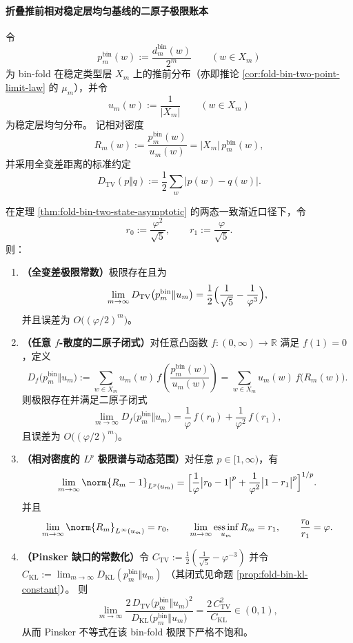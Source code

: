 \paragraph{折叠推前相对稳定层均匀基线的二原子极限账本}
令
\[
p^{\mathrm{bin}}_m(w):=\frac{d^{\mathrm{bin}}_m(w)}{2^m}\qquad(w\in X_m)
\]
为 bin-fold 在稳定类型层 \(X_m\) 上的推前分布（亦即推论 \ref{cor:fold-bin-two-point-limit-law} 的 \(\mu_m\)），并令
\[
u_m(w):=\frac{1}{|X_m|}
\qquad(w\in X_m)
\]
为稳定层均匀分布。
记相对密度
\[
R_m(w):=\frac{p^{\mathrm{bin}}_m(w)}{u_m(w)}=|X_m|\,p^{\mathrm{bin}}_m(w),
\]
并采用全变差距离的标准约定
\[
D_{\mathrm{TV}}(p\Vert q):=\frac12\sum_{w}\bigl|p(w)-q(w)\bigr|.
\]

\begin{theorem}\label{thm:xi-foldbin-pushforward-uniform-two-atom-ledger}
在定理 \ref{thm:fold-bin-two-state-asymptotic} 的两态一致渐近口径下，令
\[
r_0:=\frac{\varphi^2}{\sqrt5},\qquad r_1:=\frac{\varphi}{\sqrt5}.
\]
则：
\begin{enumerate}
  \item \textbf{（全变差极限常数）}极限存在且为
  \[
  \lim_{m\to\infty}D_{\mathrm{TV}}\bigl(p^{\mathrm{bin}}_m\Vert u_m\bigr)
  =\frac12\Bigl(\frac{1}{\sqrt5}-\frac{1}{\varphi^3}\Bigr),
  \]
  并且误差为 \(O\bigl((\varphi/2)^m\bigr)\)。
  \item \textbf{（任意 \(f\)-散度的二原子闭式）}对任意凸函数 \(f:(0,\infty)\to\mathbb R\) 满足 \(f(1)=0\)，定义
  \[
  D_f\bigl(p^{\mathrm{bin}}_m\Vert u_m\bigr)
  :=\sum_{w\in X_m}u_m(w)\,f\!\left(\frac{p^{\mathrm{bin}}_m(w)}{u_m(w)}\right)
  =\sum_{w\in X_m}u_m(w)\,f\!\bigl(R_m(w)\bigr).
  \]
  则极限存在并满足二原子闭式
  \[
  \lim_{m\to\infty}D_f\bigl(p^{\mathrm{bin}}_m\Vert u_m\bigr)
  =\frac{1}{\varphi}\,f(r_0)+\frac{1}{\varphi^2}\,f(r_1),
  \]
  且误差为 \(O\bigl((\varphi/2)^m\bigr)\)。
  \item \textbf{（相对密度的 \(L^p\) 极限谱与动态范围）}对任意 \(p\in[1,\infty)\)，有
  \[
  \lim_{m\to\infty}\norm{R_m-1}_{L^p(u_m)}
  =
  \Bigl[\frac{1}{\varphi}\bigl|r_0-1\bigr|^p+\frac{1}{\varphi^2}\bigl|1-r_1\bigr|^p\Bigr]^{1/p}.
  \]
  并且
  \[
  \lim_{m\to\infty}\norm{R_m}_{L^\infty(u_m)}=r_0,\qquad
  \lim_{m\to\infty}\operatorname*{ess\,inf}_{u_m}R_m=r_1,
  \qquad
  \frac{r_0}{r_1}=\varphi.
  \]
  \item \textbf{（Pinsker 缺口的常数化）}令
  \(
  C_{\mathrm{TV}}:=\frac12(\frac{1}{\sqrt5}-\varphi^{-3})
  \)
  并令
  \(
  C_{\mathrm{KL}}:=\lim_{m\to\infty}D_{\mathrm{KL}}(p^{\mathrm{bin}}_m\Vert u_m)
  \)
  （其闭式见命题 \ref{prop:fold-bin-kl-constant}）。
  则
  \[
  \lim_{m\to\infty}\frac{2\,D_{\mathrm{TV}}\bigl(p^{\mathrm{bin}}_m\Vert u_m\bigr)^2}{D_{\mathrm{KL}}\bigl(p^{\mathrm{bin}}_m\Vert u_m\bigr)}
  =\frac{2\,C_{\mathrm{TV}}^2}{C_{\mathrm{KL}}}\in(0,1),
  \]
  从而 Pinsker 不等式在该 bin-fold 极限下严格不饱和。
\end{enumerate}
\end{theorem}


